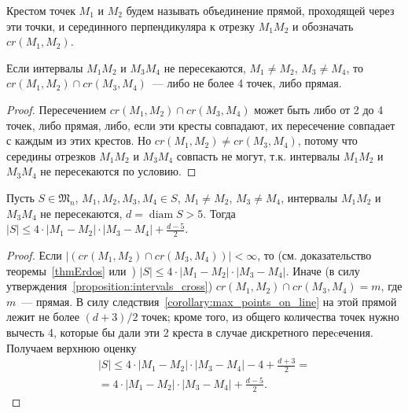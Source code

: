 \begin{definition}
	Крестом точек $M_1$ и $M_2$ будем называть объединение прямой,
	проходящей через эти точки,
	и серединного перпендикуляра к отрезку $M_1 M_2$
	и обозначать $cr(M_1,M_2)$.
\end{definition}

\begin{proposition}
	\label{proposition:intervals_cross}
	Если интервалы $M_1 M_2$ и $M_3 M_4$ не пересекаются,
	$M_1 \neq M_2$, $M_3 \neq M_4$,
	то $cr(M_1,M_2) \cap cr(M_3,M_4)$~--- либо не более 4 точек, либо прямая.
\end{proposition}

\begin{proof}
	Пересечением $cr(M_1,M_2) \cap cr(M_3,M_4)$ может быть либо от 2 до 4 точек, либо прямая,
	либо, если эти кресты совпадают, их пересечение совпадает с каждым из этих крестов.
	Но $cr(M_1,M_2) \neq cr(M_3,M_4)$, потому что середины отрезков $M_1 M_2$ и $M_3 M_4$
	совпасть не могут, т.к. интервалы $M_1 M_2$ и $M_3 M_4$ не пересекаются по условию.
\end{proof}

\begin{lemma}
	\label{lemma_preliminary_size}
	Пусть $S\in\mathfrak{M}_n$,
	$M_1, M_2, M_3, M_4 \in S$,
	$M_1 \neq M_2$, $M_3 \neq M_4$,
	интервалы $M_1 M_2$ и $M_3 M_4$ не пересекаются,
	$d = \operatorname{diam} S > 5$.
	Тогда $|S| \leq 4 \cdot |M_1 - M_2| \cdot |M_3 - M_4| + \frac{d-5}{2}$.
\end{lemma}

\begin{proof}
	Если $|(cr(M_1, M_2) \cap cr(M_3, M_4))| < \infty$,
	то (см. доказательство теоремы~\ref{thmErdos} или~\cite[часть 2, неравенство (1)]{solymosi2003note})
	$|S| \leq 4 \cdot |M_1 - M_2| \cdot |M_3 - M_4|$.
	Иначе (в силу утверждения~\ref{proposition:intervals_cross}) $cr(M_1, M_2) \cap cr(M_3, M_4) = m$,
	где $m$~--- прямая.
	В силу следствия~\ref{corollary:max_points_on_line} на этой прямой лежит не более $(d+3)/2$ точек;
	кроме того, из общего количества точек нужно вычесть 4,
	которые бы дали эти 2 креста в случае дискретного переcечения.
	Получаем верхнюю оценку
	\begin{multline}
		|S| \leq 4 \cdot |M_1 - M_2| \cdot |M_3 - M_4| - 4 + \frac{d+3}{2}
		=
		\\=
		4 \cdot |M_1 - M_2| \cdot |M_3 - M_4| + \frac{d-5}{2}
		.
	\end{multline}
\end{proof}

